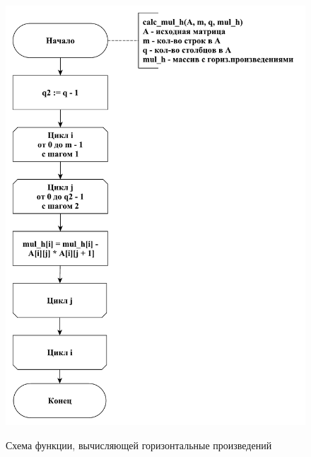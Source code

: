 \documentclass[a4paper,12pt]{article}
\begin{document}
	    	    \begin{figure}[h!]
	    	\begin{center}
	    		{\includegraphics[scale = 0.5]{schema02.pdf}}
	    		\caption{Схема функции, вычисляющей горизонтальные произведений}
	    		\label{fig:schema_h}
	    	\end{center}
	    \end{figure}
	    
\end{document}
